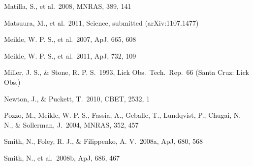 \documentclass{emulateapj}
\begin{document}
\begin{references}
 Matilla, S., et al.\ 2008, MNRAS, 389, 141

 Matsuura, M., et al.\ 2011, Science, submitted (arXiv:1107.1477)

 Meikle, W. P. S., et al.\ 2007, ApJ, 665, 608

 Meikle, W. P. S., et al.\ 2011, ApJ, 732, 109

 Miller, J. S., \& Stone, R. P. S.\ 1993, Lick Obs.\ Tech.\
Rep.\ 66 (Santa Cruz: Lick Obs.)

 Newton, J., \& Puckett, T.\ 2010, CBET, 2532, 1



 Pozzo, M., Meikle, W. P. S., Fassia, A., Geballe, T.,
Lundqvist, P., Chugai, N. N., \& Sollerman, J.\ 2004, MNRAS, 352, 457













 Smith, N., Foley, R. J., \& Filippenko, A. V.\ 2008a,
ApJ, 680, 568

 Smith, N., et al.\ 2008b, ApJ, 686, 467  %


\end{references}
\end{document}
